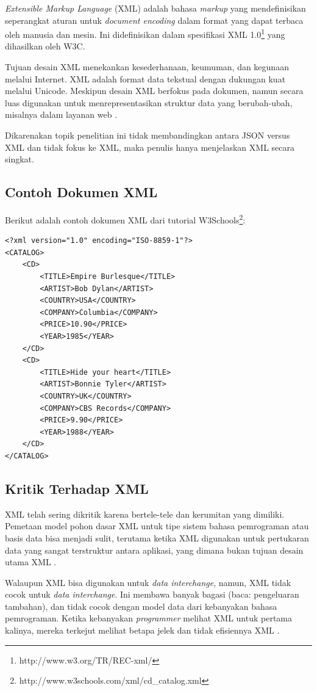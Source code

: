 \documentclass[a4paper, 12pt, oneside]{report}
\begin{document}
\onehalfspacing \textit{Extensible Markup Language} (XML) adalah bahasa \textit{markup} yang mendefinisikan seperangkat aturan untuk \textit{document encoding} dalam format yang dapat terbaca oleh manusia dan mesin. Ini didefinisikan dalam spesifikasi XML 1.0\footnote{http://www.w3.org/TR/REC-xml/} yang dihasilkan oleh W3C.

\onehalfspacing Tujuan desain XML menekankan kesederhanaan, keumuman, dan kegunaan melalui Internet. XML adalah format data tekstual dengan dukungan kuat melalui Unicode. Meskipun desain XML berfokus pada dokumen, namun secara luas digunakan untuk menrepresentasikan struktur data yang berubah-ubah, misalnya dalam layanan web \cite{xml-wikipedia}.

\onehalfspacing Dikarenakan topik penelitian ini tidak membandingkan antara JSON versus XML dan tidak fokus ke XML, maka penulis hanya menjelaskan XML secara singkat.

\subsection{Contoh Dokumen XML}
\onehalfspacing Berikut adalah contoh dokumen XML dari tutorial W3Schools\footnote{http://www.w3schools.com/xml/cd\_catalog.xml}:

\begin{lstlisting}[frame=single]
<?xml version="1.0" encoding="ISO-8859-1"?>
<CATALOG>
	<CD>
		<TITLE>Empire Burlesque</TITLE>
		<ARTIST>Bob Dylan</ARTIST>
		<COUNTRY>USA</COUNTRY>
		<COMPANY>Columbia</COMPANY>
		<PRICE>10.90</PRICE>
		<YEAR>1985</YEAR>
	</CD>
	<CD>
		<TITLE>Hide your heart</TITLE>
		<ARTIST>Bonnie Tyler</ARTIST>
		<COUNTRY>UK</COUNTRY>
		<COMPANY>CBS Records</COMPANY>
		<PRICE>9.90</PRICE>
		<YEAR>1988</YEAR>
	</CD>
</CATALOG>
\end{lstlisting}

\subsection{Kritik Terhadap XML}

\onehalfspacing XML telah sering dikritik karena bertele-tele dan kerumitan yang dimiliki. Pemetaan model pohon dasar XML untuk tipe sistem bahasa pemrograman atau basis data bisa menjadi sulit, terutama ketika XML digunakan untuk pertukaran data yang sangat terstruktur antara aplikasi, yang dimana bukan tujuan desain utama XML \cite{xml-wikipedia}.

\onehalfspacing Walaupun XML bisa digunakan untuk \textit{data interchange}, namun, XML tidak cocok untuk \textit{data interchange}. Ini membawa banyak bagasi (baca: pengeluaran tambahan), dan tidak cocok dengan model data dari kebanyakan bahasa pemrograman. Ketika kebanyakan \textit{programmer} melihat XML untuk pertama kalinya, mereka terkejut melihat betapa jelek dan tidak efisiennya XML \cite{json-fat-free}.
\end{document}
